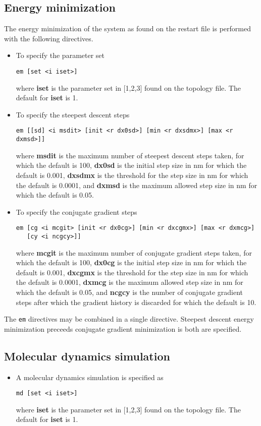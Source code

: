 \subsection{Energy minimization}
The energy minimization of the system as found on the restart file 
is performed with the following directives.
\begin{itemize}
\item
To specify the parameter set
\begin{verbatim}
em [set <i iset>] 
\end{verbatim}
where {\bf iset} is the parameter set in [1,2,3] found on the
topology file. The default for {\bf iset} is 1.
\item
To specify the steepest descent steps
\begin{verbatim}
em [[sd] <i msdit> [init <r dx0sd>] [min <r dxsdmx>] [max <r dxmsd>]] 
\end{verbatim}
where {\bf msdit} is the maximum number of steepest descent steps taken,
for which the default is 100, {\bf dx0sd} is the initial step size in nm
for which the default is 0.001, {\bf dxsdmx} is the threshold for the
step size in nm for which the default is 0.0001, and {\bf dxmsd} is the
maximum allowed step size in nm for which the default is 0.05.
\item
To specify the conjugate gradient steps
\begin{verbatim}
em [cg <i mcgit> [init <r dx0cg>] [min <r dxcgmx>] [max <r dxmcg>]
   [cy <i ncgcy>]]
\end{verbatim}
where {\bf mcgit} is the maximum number of conjugate gradient steps taken,
for which the default is 100, {\bf dx0cg} is the initial step size in nm
for which the default is 0.001, {\bf dxcgmx} is the threshold for the
step size in nm for which the default is 0.0001, {\bf dxmcg} is the
maximum allowed step size in nm for which the default is 0.05, and {\bf ncgcy}
is the number of conjugate gradient steps after which the gradient history
is discarded for which the default is 10.
\end{itemize}
The \verb+em+ directives may be combined in a single directive. Steepest
descent energy minimization preceeds conjugate gradient minimization is
both are specified.
\subsection{Molecular dynamics simulation}
\begin{itemize}
\item
A molecular dynamics simulation is specified as
\begin{verbatim}
md [set <i iset>]
\end{verbatim}
where {\bf iset} is the parameter set in [1,2,3] found on the
topology file. The default for {\bf iset} is 1.
\end{itemize}
